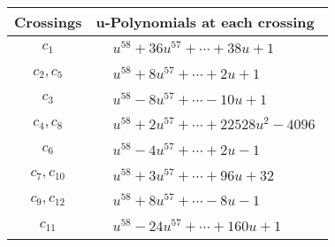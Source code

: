 \documentclass[1p]{elsarticle_modified}
\theoremstyle{definition}
\begin{document}
\begin{tabular}{m{50pt}|m{274pt}}
Crossings & \hspace{64pt}u-Polynomials at each crossing \\
\hline $$\begin{aligned}c_{1}\end{aligned}$$&$\begin{aligned}
&u^{58}+36 u^{57}+\cdots+38 u+1
\end{aligned}$\\
\hline $$\begin{aligned}c_{2},c_{5}\end{aligned}$$&$\begin{aligned}
&u^{58}+8 u^{57}+\cdots+2 u+1
\end{aligned}$\\
\hline $$\begin{aligned}c_{3}\end{aligned}$$&$\begin{aligned}
&u^{58}-8 u^{57}+\cdots-10 u+1
\end{aligned}$\\
\hline $$\begin{aligned}c_{4},c_{8}\end{aligned}$$&$\begin{aligned}
&u^{58}+2 u^{57}+\cdots+22528 u^2-4096
\end{aligned}$\\
\hline $$\begin{aligned}c_{6}\end{aligned}$$&$\begin{aligned}
&u^{58}-4 u^{57}+\cdots+2 u-1
\end{aligned}$\\
\hline $$\begin{aligned}c_{7},c_{10}\end{aligned}$$&$\begin{aligned}
&u^{58}+3 u^{57}+\cdots+96 u+32
\end{aligned}$\\
\hline $$\begin{aligned}c_{9},c_{12}\end{aligned}$$&$\begin{aligned}
&u^{58}+8 u^{57}+\cdots-8 u-1
\end{aligned}$\\
\hline $$\begin{aligned}c_{11}\end{aligned}$$&$\begin{aligned}
&u^{58}-24 u^{57}+\cdots+160 u+1
\end{aligned}$\\
\hline
\end{tabular}\\~\\
\end{document}
